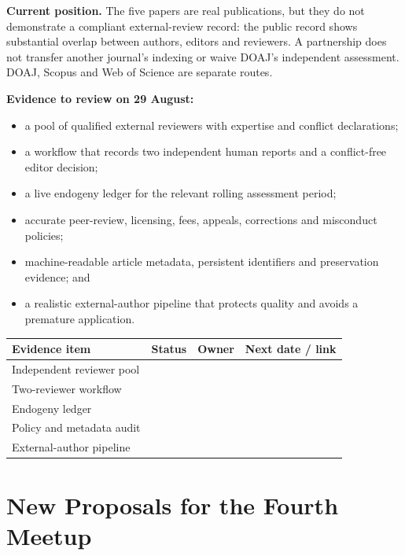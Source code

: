 \documentclass[11pt]{article}
\begin{document}
\begin{warnbox}
\textbf{Current position.} The five papers are real publications, but they do not demonstrate a compliant external-review record: the public record shows substantial overlap between authors, editors and reviewers. A partnership does not transfer another journal's indexing or waive DOAJ's independent assessment. DOAJ, Scopus and Web of Science are separate routes.
\end{warnbox}

\textbf{Evidence to review on 29 August:}
\begin{itemize}
  \item a pool of qualified external reviewers with expertise and conflict declarations;
  \item a workflow that records two independent human reports and a conflict-free editor decision;
  \item a live endogeny ledger for the relevant rolling assessment period;
  \item accurate peer-review, licensing, fees, appeals, corrections and misconduct policies;
  \item machine-readable article metadata, persistent identifiers and preservation evidence; and
  \item a realistic external-author pipeline that protects quality and avoids a premature application.
\end{itemize}

\begin{center}\small
\begin{tabular}{@{}p{5.1cm}p{2.2cm}p{3.1cm}p{3.3cm}@{}}
\toprule
\textbf{Evidence item} & \textbf{Status} & \textbf{Owner} & \textbf{Next date / link} \\
\midrule
Independent reviewer pool & & & \\[9pt]
Two-reviewer workflow & & & \\[9pt]
Endogeny ledger & & & \\[9pt]
Policy and metadata audit & & & \\[9pt]
External-author pipeline & & & \\[9pt]
\bottomrule
\end{tabular}
\end{center}

\section{New Proposals for the Fourth Meetup}
\end{document}

